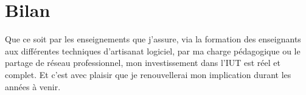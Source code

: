 \documentclass[a4paper]{article}
\begin{document}
\section{Bilan}

Que ce soit par les enseignements que j'assure, via la formation des enseignants aux différentes techniques d'artisanat logiciel, par ma charge pédagogique ou le partage de réseau professionnel, mon investissement dans l'IUT est réel et complet. Et c'est avec plaisir que je renouvellerai mon implication durant les années à venir.
\end{document}
